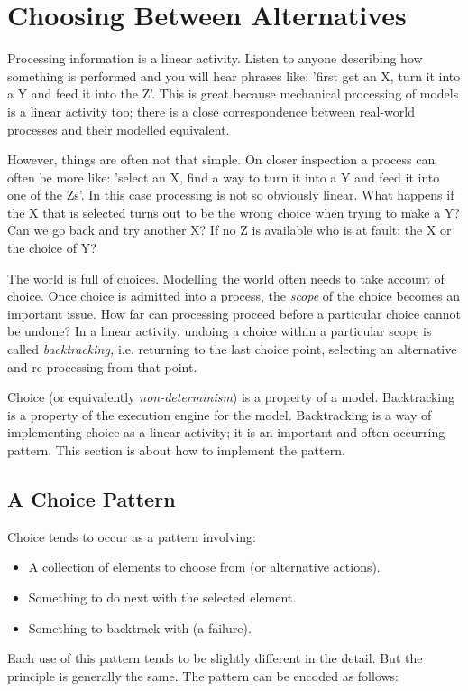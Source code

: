 
\chapter{Choosing Between Alternatives}

Processing information is a linear activity. Listen to anyone describing
how something is performed and you will hear phrases like: 'first
get an X, turn it into a Y and feed it into the Z'. This is great
because mechanical processing of models is a linear activity too;
there is a close correspondence between real-world processes and their
modelled equivalent.

However, things are often not that simple. On closer inspection a
process can often be more like: 'select an X, find a way to turn it
into a Y and feed it into one of the Zs'. In this case processing
is not so obviously linear. What happens if the X that is selected
turns out to be the wrong choice when trying to make a Y? Can we go
back and try another X? If no Z is available who is at fault: the
X or the choice of Y?

The world is full of choices. Modelling the world often needs to take
account of choice. Once choice is admitted into a process, the \textit{scope}
of the choice becomes an important issue. How far can processing proceed
before a particular choice cannot be undone? In a linear activity,
undoing a choice within a particular scope is called \textit{backtracking,}
i.e. returning to the last choice point, selecting an alternative
and re-processing from that point.

Choice (or equivalently \textit{non-determinism}) is a property of
a model. Backtracking is a property of the execution engine for the
model. Backtracking is a way of implementing choice as a linear activity;
it is an important and often occurring pattern. This section is about
how to implement the pattern.


\section{A Choice Pattern}

Choice tends to occur as a pattern involving:

\begin{itemize}
\item A collection of elements to choose from (or alternative actions).
\item Something to do next with the selected element.
\item Something to backtrack with (a failure).
\end{itemize}
Each use of this pattern tends to be slightly different in the detail.
But the principle is generally the same. The pattern can be encoded
as follows:

